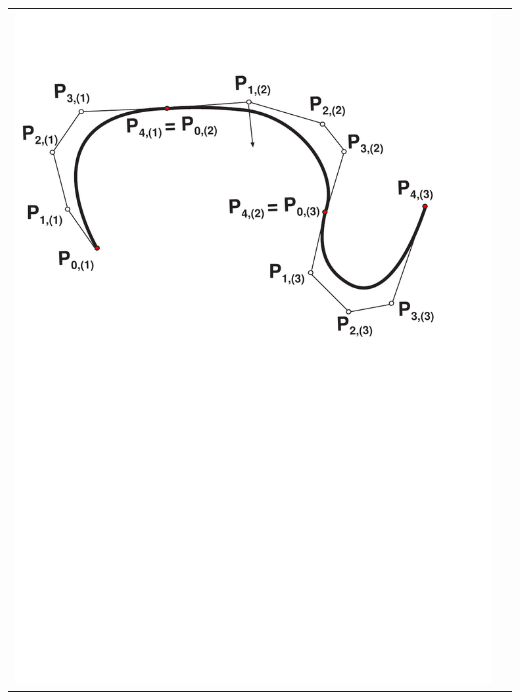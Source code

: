 \documentclass[ebook,oneside]{memoir}
\begin{document}
\begin{center}
\begin{tabular}{cc}
\includegraphics[scale=0.45]{3_23a.pdf} &

\end{tabular}
\end{center}
\end{document}
